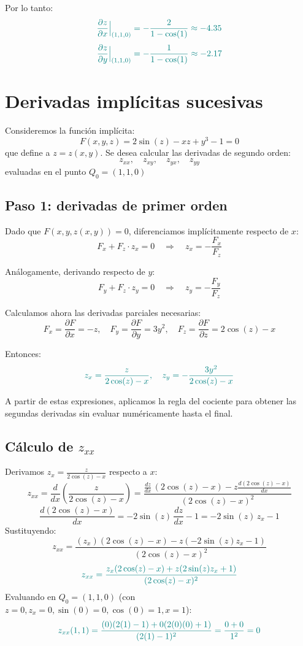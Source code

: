 \documentclass{article}
\begin{document}
Por lo tanto:
\[
\color{teal}
\frac{\partial z}{\partial x}\Big|_{(1,1,0)} = -\frac{2}{1 - \cos(1)} \approx -4.35
\]
\[
\color{teal}
\frac{\partial z}{\partial y}\Big|_{(1,1,0)} = -\frac{1}{1 - \cos(1)} \approx -2.17
\]

\section*{Derivadas implícitas sucesivas}

Consideremos la función implícita:
\[
F(x,y,z) = 2\sin(z) - xz + y^3 - 1 = 0
\]
que define a \( z = z(x,y) \). Se desea calcular las derivadas de segundo orden:
\[
z_{xx},\quad z_{xy},\quad z_{yx},\quad z_{yy}
\]
evaluadas en el punto \( Q_0 = (1,1,0) \)

\subsection*{Paso 1: derivadas de primer orden}

Dado que \( F(x,y,z(x,y)) = 0 \), diferenciamos implícitamente respecto de \( x \):
\[
F_x + F_z \cdot z_x = 0 \quad \Rightarrow \quad z_x = -\frac{F_x}{F_z}
\]

Análogamente, derivando respecto de \( y \):
\[
F_y + F_z \cdot z_y = 0 \quad \Rightarrow \quad z_y = -\frac{F_y}{F_z}
\]

Calculamos ahora las derivadas parciales necesarias:
\[
F_x = \frac{\partial F}{\partial x} = -z, \quad
F_y = \frac{\partial F}{\partial y} = 3y^2, \quad
F_z = \frac{\partial F}{\partial z} = 2\cos(z) - x
\]

Entonces:
\[
\color{teal}
z_x = \frac{z}{2\cos(z) - x}, \quad
z_y = -\frac{3y^2}{2\cos(z) - x}
\]

A partir de estas expresiones, aplicamos la regla del cociente para obtener las segundas derivadas sin evaluar numéricamente hasta el final.

\subsection*{Cálculo de \( z_{xx} \)}


Derivamos \( z_x = \frac{z}{2\cos(z) - x} \) respecto a \( x \):
\[ z_{xx} = \frac{d}{dx}\left(\frac{z}{2\cos(z) - x}\right) = \frac{\frac{dz}{dx}\,(2\cos(z) - x) - z \frac{d(2\cos(z) - x)}{dx}}{(2\cos(z) - x)^2} \]
\[ \frac{d(2\cos(z) - x)}{dx} = -2\sin(z)\,\frac{dz}{dx} - 1 = -2\sin(z)\,z_x - 1 \]
Sustituyendo:
\[ z_{xx} = \frac{(z_x)(2\cos(z) - x) - z(-2\sin(z) z_x - 1)}{(2\cos(z) - x)^2} \]
\[ \color{teal}z_{xx} = \frac{z_x(2\cos(z) - x) + z(2\sin(z) z_x + 1)}{(2\cos(z) - x)^2} \]
Evaluando en \( Q_0 = (1,1,0) \) (con \( z=0, z_x=0, \sin(0)=0, \cos(0)=1, x=1 \)):
\[ \color{teal} z_{xx}(1,1) = \frac{(0)(2(1) - 1) + 0(2(0)(0) + 1)}{(2(1) - 1)^2} = \frac{0 + 0}{1^2} = 0 \]
\end{document}
